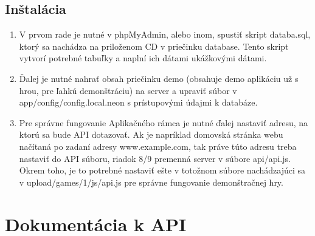 \section{Inštalácia}
\begin{enumerate}
\item V prvom rade je nutné v phpMyAdmin, alebo inom, spustiť skript databa.sql, ktorý sa nachádza na priloženom CD v priečinku database. Tento skript vytvorí potrebné tabuľky a naplní ich dátami ukážkovými dátami. 
\item Ďalej je nutné nahrať obsah priečinku demo (obsahuje demo aplikáciu už s hrou, pre ľahkú demonštráciu) na server a upraviť súbor v app/config/config.local.neon s prístupovými údajmi k databáze. 
\item Pre správne fungovanie Aplikačného rámca je nutné ďalej nastaviť adresu, na ktorú sa bude API dotazovať. Ak je napríklad domovská stránka webu načítaná po zadaní adresy www.example.com, tak práve túto adresu treba nastaviť do API súboru, riadok 8/9 premenná server v súbore api/api.js. Okrem toho, je to potrebné nastaviť ešte v totožnom súbore nachádzajúci sa v upload/games/1/js/api.js pre správne fungovanie demonštračnej hry.
\end{enumerate}

\chapter{Dokumentácia k API}
\label{pr:dokumentacia}
